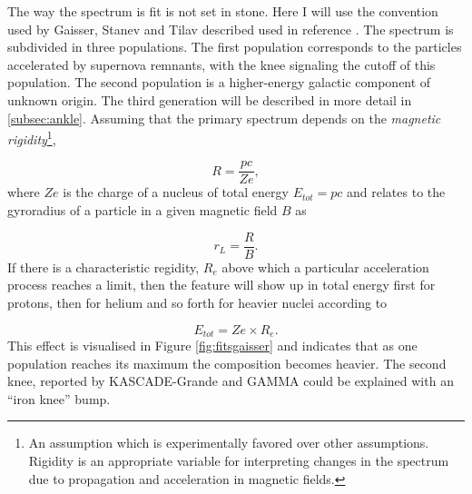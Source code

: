 The way the spectrum is fit is not set in stone. Here I will use the convention used by Gaisser, Stanev and Tilav described used in reference \cite{Gaisser:2013bla}. The spectrum is subdivided in three populations. The first population corresponds to the particles accelerated by supernova remnants, with the knee signaling the cutoff of this population. The second population is a higher-energy galactic component of unknown origin. The third generation will be described in more detail in \ref{subsec:ankle}. Assuming that the primary spectrum depends on the \textit{magnetic rigidity}\footnote{An assumption which is experimentally favored over other assumptions. Rigidity is an appropriate variable for interpreting changes in the spectrum due to propagation and acceleration in magnetic fields.},

\begin{equation}
R = \frac{pc}{Ze},
\end{equation}
where $Ze$ is the charge of a nucleus of total energy $E_{tot} = pc$ and relates to the gyroradius of a particle in a given magnetic field $B$ as

\begin{equation}
\label{eq:gyro}
r_L = \frac{R}{B}.
\end{equation}
If there is a characteristic regidity, $R_e$ above which a particular acceleration process reaches a limit, then the feature will show up in total energy first for protons, then for helium and so forth for heavier nuclei according to

\begin{equation}
E_{tot} = Ze \times R_e.
\end{equation}
This effect is visualised in Figure \ref{fig:fitsgaisser} and indicates that as one population reaches its maximum the composition becomes heavier. The second knee, reported by KASCADE-Grande \cite{Apel:2011mi} and GAMMA \cite{Garyaka:2008gs} could be explained with an ``iron knee'' bump.

